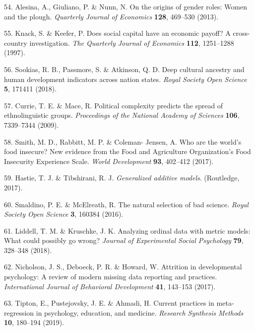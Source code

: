 \documentclass[
  english,
  man,floatsintext]{apa6}
\begin{document}
\leavevmode\hypertarget{ref-Alesina2013}{}%
54. Alesina, A., Giuliano, P. \& Nunn, N. On the origins of gender roles: Women and the plough. \emph{Quarterly Journal of Economics} \textbf{128}, 469--530 (2013).

\leavevmode\hypertarget{ref-Knack1997}{}%
55. Knack, S. \& Keefer, P. Does social capital have an economic payoff? A cross-country investigation. \emph{The Quarterly Journal of Economics} \textbf{112}, 1251--1288 (1997).

\leavevmode\hypertarget{ref-Sookias2018}{}%
56. Sookias, R. B., Passmore, S. \& Atkinson, Q. D. Deep cultural ancestry and human development indicators across nation states. \emph{Royal Society Open Science} \textbf{5}, 171411 (2018).

\leavevmode\hypertarget{ref-Currie2009}{}%
57. Currie, T. E. \& Mace, R. Political complexity predicts the spread of ethnolinguistic groups. \emph{Proceedings of the National Academy of Sciences} \textbf{106}, 7339--7344 (2009).

\leavevmode\hypertarget{ref-Smith2017}{}%
58. Smith, M. D., Rabbitt, M. P. \& Coleman- Jensen, A. Who are the world's food insecure? New evidence from the Food and Agriculture Organization's Food Insecurity Experience Scale. \emph{World Development} \textbf{93}, 402--412 (2017).

\leavevmode\hypertarget{ref-Hastie2017}{}%
59. Hastie, T. J. \& Tibshirani, R. J. \emph{Generalized additive models}. (Routledge, 2017).

\leavevmode\hypertarget{ref-Smaldino2016}{}%
60. Smaldino, P. E. \& McElreath, R. The natural selection of bad science. \emph{Royal Society Open Science} \textbf{3}, 160384 (2016).

\leavevmode\hypertarget{ref-Liddell2018}{}%
61. Liddell, T. M. \& Kruschke, J. K. Analyzing ordinal data with metric models: What could possibly go wrong? \emph{Journal of Experimental Social Psychology} \textbf{79}, 328--348 (2018).

\leavevmode\hypertarget{ref-Nicholson2017}{}%
62. Nicholson, J. S., Deboeck, P. R. \& Howard, W. Attrition in developmental psychology: A review of modern missing data reporting and practices. \emph{International Journal of Behavioral Development} \textbf{41}, 143--153 (2017).

\leavevmode\hypertarget{ref-Tipton2019}{}%
63. Tipton, E., Pustejovsky, J. E. \& Ahmadi, H. Current practices in meta-regression in psychology, education, and medicine. \emph{Research Synthesis Methods} \textbf{10}, 180--194 (2019).
\end{document}
